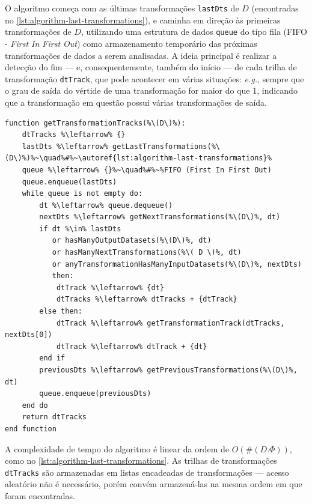O algoritmo começa com as últimas transformações \texttt{lastDts} de \( D \) (encontradas no \autoref{lst:algorithm-last-transformations}), e caminha em direção às primeiras transformações de \( D \), utilizando uma estrutura de dados \texttt{queue} do tipo fila (FIFO - \textit{First In First Out}) como armazenamento temporário das próximas transformações de dados a serem analisadas. A ideia principal é realizar a detecção do fim --- e, consequentemente, também do início --- de cada trilha de transformação \texttt{dtTrack}, que pode acontecer em várias situações: \textit{e.g.}, sempre que o grau de saída do vértide de uma transformação for maior do que 1, indicando que a transformação em questão possui várias transformações de saída.

\begin{minipage}[c]{0.95\textwidth}
\begin{lstlisting}[language=pseudocode,label={lst:algorithm-transformation-tracks},caption={[Detecção das trilhas de transformações]Detecção do rastro do fluxo de dados no nível de trilhas de transformações.}]
function getTransformationTracks(%\(D\)%):
    dtTracks %\leftarrow% {}
    lastDts %\leftarrow% getLastTransformations(%\(D\)%)%~\quad%#%~\autoref{lst:algorithm-last-transformations}%
    queue %\leftarrow% {}%~\quad%#%~%FIFO (First In First Out)
    queue.enqueue(lastDts)
    while queue is not empty do:
        dt %\leftarrow% queue.dequeue()
        nextDts %\leftarrow% getNextTransformations(%\(D\)%, dt)
        if dt %\in% lastDts
           or hasManyOutputDatasets(%\(D\)%, dt)
           or hasManyNextTransformations(%\( D \)%, dt)
           or anyTransformationHasManyInputDatasets(%\(D\)%, nextDts)
           then:
            dtTrack %\leftarrow% {dt}
            dtTracks %\leftarrow% dtTracks + {dtTrack}
        else then:
            dtTrack %\leftarrow% getTransformationTrack(dtTracks, nextDts[0])
            dtTrack %\leftarrow% dtTrack + {dt}
        end if
        previousDts %\leftarrow% getPreviousTransformations(%\(D\)%, dt)
        queue.enqueue(previousDts)
    end do
    return dtTracks
end function
\end{lstlisting}
\end{minipage}

A complexidade de tempo do algoritmo é linear da ordem de \( O(\#(D.\Phi)) \), como no \autoref{lst:algorithm-last-transformations}. As trilhas de transformações \texttt{dtTracks} são armazenadas em listas encadeadas de transformações --- acesso aleatório não é necessário, porém convém armazená-las na mesma ordem em que foram encontradas.

